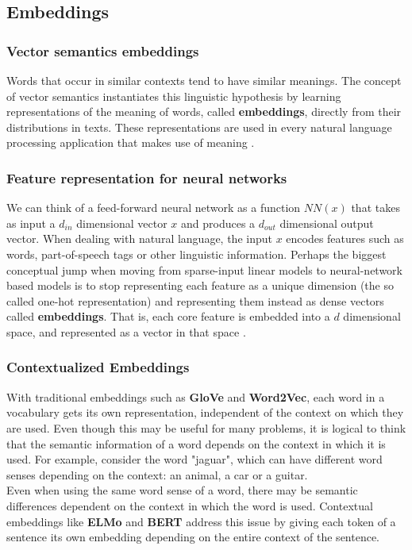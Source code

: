 \subsection{Embeddings}

\subsubsection{Vector semantics embeddings}
Words that occur in similar contexts tend to have similar meanings. The concept of vector semantics instantiates this linguistic hypothesis by learning representations of the meaning of words, called {\bf embeddings}, directly from their distributions in texts. These representations are used in every natural language processing application that makes use of meaning \cite{jurafskyBook}.

\subsubsection{Feature representation for neural networks}
We can think of a feed-forward neural network as a function $NN(x)$ that takes as input a $d_{in}$ dimensional vector $x$ and produces a $d_{out}$ dimensional output vector. When dealing with natural language, the input $x$ encodes features  such  as  words, part-of-speech tags or other linguistic information. Perhaps the biggest conceptual jump when moving from sparse-input linear models to neural-network based models is to stop representing each feature as a unique dimension (the so called one-hot representation) and representing them instead as dense vectors called {\bf embeddings}. That is, each core feature is embedded into a $d$ dimensional space, and represented as a vector in that space \cite{goldberg2015primer}.

\subsubsection{Contextualized Embeddings}
With traditional embeddings such as {\bf GloVe} and {\bf Word2Vec}, each word in a vocabulary gets its own representation, independent of the context on which they are used. Even though this may be useful for many problems, it is logical to think that the semantic information of a word depends on the context in which it is used. For example, consider the word "jaguar", which can have different word senses depending on the context: an animal, a car or a guitar.\\
Even when using the same word sense of a word, there may be semantic differences dependent on the context in which the word is used. Contextual embeddings like {\bf ELMo} and {\bf BERT} address this issue by giving each token of a sentence its own embedding depending on the entire context of the sentence.

